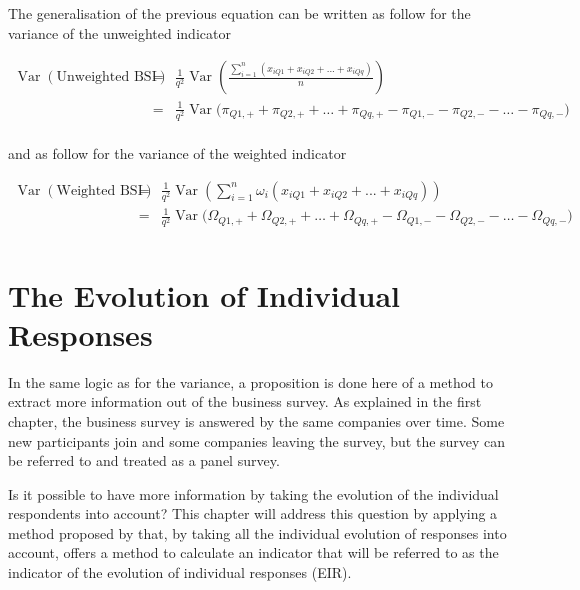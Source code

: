 \documentclass[12pt,a4paper,oneside]{book}
\DeclareMathOperator{\Var}{Var}
\begin{document}
The generalisation of the previous equation can be written as follow for the variance of the unweighted indicator

\begin{eqnarray}
    \Var \left(\text{Unweighted BSI} \right) 
    &=& \frac{1}{q^2} \Var \left(\frac{\sum_{i=1}^n \left( x_{i Q1} + x_{i Q2} + ... + x_{i Qq} \right)}{n} \right) \nonumber \\
    &=& \frac{1}{q^2} \Var \big(\pi_{Q1,+} + \pi_{Q2,+} + \ldots + \pi_{Qq,+} - \pi_{Q1,-} - \pi_{Q2,-} - \ldots - \pi_{Qq,-} \big) \nonumber \\
\end{eqnarray}

and as follow for the variance of the weighted indicator

\begin{eqnarray}
    \Var \left(\text{Weighted BSI} \right) 
    &=& \frac{1}{q^2} \Var \left( \sum_{i=1}^n \omega_i \left(x_{i Q1} + x_{i Q2} + ... + x_{i Qq} \right) \right) \nonumber \\
    &=& \frac{1}{q^2} \Var \big(\Omega_{Q1,+} + \Omega_{Q2,+} + \ldots + \Omega_{Qq,+} - \Omega_{Q1,-} - \Omega_{Q2,-} - \ldots - \Omega_{Qq,-} \big) \nonumber \\
\end{eqnarray}




\chapter{The Evolution of Individual Responses}

In the same logic as for the variance, a proposition is done here of a method to extract more information out of the business survey. 
As explained in the first chapter, the business survey is answered by the same companies over time. Some new participants join and some companies leaving the survey, but the survey can be referred to and treated as a panel survey.

Is it possible to have more information by taking the evolution of the individual respondents into account? 
This chapter will address this question by applying a method proposed by \cite{caron_estimation_1996} that, by taking all the individual evolution of responses into account, offers a method to calculate an indicator that will be referred to as the indicator of the evolution of individual responses (EIR).

\end{document}
